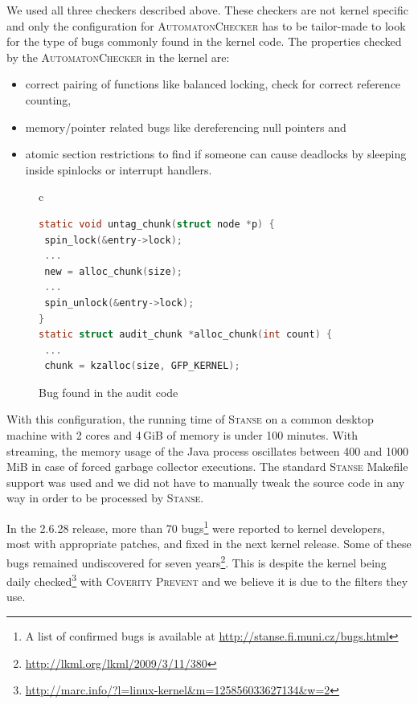 \documentclass[10pt]{llncs}
\newcommand{\Stanse}{\textsc{Stanse}\xspace}
\newcommand{\AC}{\textsc{AutomatonChecker}\xspace}
\begin{document}
We used all three checkers described above. These checkers are not kernel
specific and only the configuration for \AC has to be tailor-made to look for
the type of bugs commonly found in the kernel code. The properties checked by
the \AC in the kernel are:
\begin{itemize}
\item correct pairing of functions like balanced locking, check for correct
  reference counting,
\item memory/pointer related bugs like dereferencing null pointers and
\item atomic section restrictions to find if someone can cause deadlocks by
sleeping inside spinlocks or interrupt handlers.
\end{itemize}

\begin{figure}[tb]
\begin{center}
\begin{tabular}{c}
\begin{lstlisting}[language=C]
static void untag_chunk(struct node *p) {
 spin_lock(&entry->lock);
 ...
 new = alloc_chunk(size);
 ...
 spin_unlock(&entry->lock);
}
static struct audit_chunk *alloc_chunk(int count) {
 ...
 chunk = kzalloc(size, GFP_KERNEL);
\end{lstlisting}
\end{tabular}
\end{center}
\caption{Bug found in the audit code}
\label{fig:error}
\end{figure}

With this configuration, the running time of \Stanse on a common desktop
machine with 2 cores and 4\,GiB of memory is under 100 minutes. With
streaming, the memory usage of the Java process oscillates between 400 and
1000\,MiB in case of forced garbage collector executions. The standard \Stanse
\textsf{Makefile} support was used and we did not have to manually tweak the
source code in any way in order to be processed by \Stanse.

In the 2.6.28 release, more than 70 bugs\footnote{A list of confirmed bugs is
available at \url{http://stanse.fi.muni.cz/bugs.html}} were reported to kernel
developers, most with appropriate patches, and fixed in the next kernel
release. Some of these bugs remained undiscovered for seven
years\footnote{\url{http://lkml.org/lkml/2009/3/11/380}}. This is despite the
kernel being daily
checked\footnote{\url{http://marc.info/?l=linux-kernel&m=125856033627134&w=2}}
with \textsc{Coverity Prevent} and we believe it is due to the filters they
use.
\end{document}

